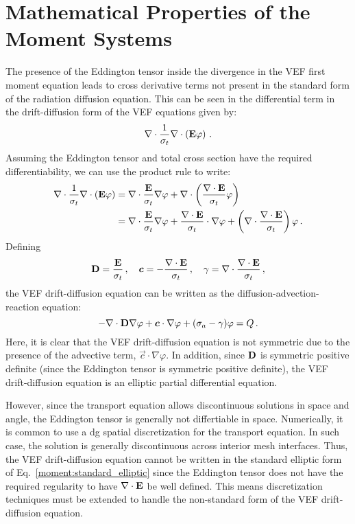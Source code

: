 \documentclass[../doc.tex]{subfiles}
\begin{document}
\section{Mathematical Properties of the Moment Systems}
The presence of the Eddington tensor inside the divergence in the VEF first moment equation leads to cross derivative terms not present in the standard form of the radiation diffusion equation. This can be seen in the differential term in the drift-diffusion form of the VEF equations given by:
	\begin{equation}
		\nabla\cdot\frac{1}{\sigma_t}\nabla\cdot\left( \boldsymbol{\mathrm{E}}\varphi \right) \,. 
	\end{equation}
Assuming the Eddington tensor and total cross section have the required differentiability, we can use the product rule to write:
	\begin{equation}
	\begin{aligned}
		\nabla\cdot\frac{1}{\sigma_t}\nabla\cdot\left( \boldsymbol{\mathrm{E}}\varphi \right) &= \nabla\cdot\frac{\boldsymbol{\mathrm{E}}}{\sigma_t}\nabla\varphi + \nabla\cdot\left( \frac{\nabla\cdot\boldsymbol{\mathrm{E}}}{\sigma_t}\varphi \right) \\
		&= \nabla\cdot\frac{\boldsymbol{\mathrm{E}}}{\sigma_t}\nabla\varphi + \frac{\nabla\cdot\boldsymbol{\mathrm{E}}}{\sigma_t}\cdot\nabla\varphi + \left( \nabla\cdot\frac{\nabla\cdot\boldsymbol{\mathrm{E}}}{\sigma_t} \right) \varphi \,. 
	\end{aligned}
	\end{equation}
Defining 
	\begin{equation}
		\boldsymbol{\mathrm{D}} = \frac{\boldsymbol{\mathrm{E}}}{\sigma_t}\,,\quad \boldsymbol{c} = -\frac{\nabla\cdot\boldsymbol{\mathrm{E}}}{\sigma_t}\,, \quad \gamma = \nabla\cdot\frac{\nabla\cdot\boldsymbol{\mathrm{E}}}{\sigma_t} \,,
	\end{equation}
the VEF drift-diffusion equation can be written as the diffusion-advection-reaction equation: 
	\begin{equation} \label{moment:standard_elliptic}
		-\nabla\cdot\boldsymbol{\mathrm{D}}\nabla\varphi + \boldsymbol{c}\cdot\nabla\varphi + (\sigma_a - \gamma) \varphi = Q \,. 
	\end{equation}
Here, it is clear that the VEF drift-diffusion equation is not symmetric due to the presence of the advective term, $\vec{c}\cdot\nabla\varphi$. In addition, since $\boldsymbol{\mathrm{D}}$ is symmetric positive definite (since the Eddington tensor is symmetric positive definite), the VEF drift-diffusion equation is an elliptic partial differential equation. 

However, since the transport equation allows discontinuous solutions in space and angle, the Eddington tensor is generally not differtiable in space. Numerically, it is common to use a \gls{dg} spatial discretization for the transport equation. In such case, the solution is generally discontinuous across interior mesh interfaces. Thus, the VEF drift-diffusion equation cannot be written in the standard elliptic form of Eq.~\ref{moment:standard_elliptic} since the Eddington tensor does not have the required regularity to have $\nabla\cdot\boldsymbol{\mathrm{E}}$ be well defined. This means discretization techniques must be extended to handle the non-standard form of the VEF drift-diffusion equation. 
\end{document}
